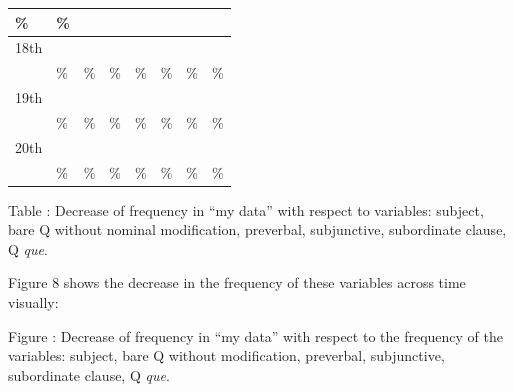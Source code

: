 \begin{center}
\begin{supertabular}{|m{0.7698598in}|m{0.6108598in}|m{0.6122598in}|m{0.6115598in}|m{0.6108598in}|m{0.6115598in}|m{0.6122598in}|m{0.6080598in}|}
\% &
\centering{}\%\\\hline
\centering 18th &
 &
 &
 &
 &
 &
 &
\centering{}\\\hline
 &
\% &
\% &
\% &
\% &
\% &
\% &
\centering{}\%\\\hline
\centering 19th &
 &
 &
 &
 &
 &
 &
\centering{}\\\hline
 &
\% &
\% &
\% &
\% &
\% &
\% &
\centering{}\%\\\hline
\centering 20th &
 &
 &
 &
 &
 &
 &
\centering{}\\\hline
 &
\% &
\% &
\% &
\% &
\% &
\% &
\centering{}\%\\\hline
\end{supertabular}
\end{center}
\begin{styleStandard}
Table : Decrease of frequency in “my data” with respect to variables: subject, bare Q without nominal modification, preverbal, subjunctive, subordinate clause, Q \textit{que}.
\end{styleStandard}

\begin{styleStandard}
Figure 8 shows the decrease in the frequency of these variables across time visually:
\end{styleStandard}

\begin{styleStandard}
Figure : Decrease of frequency in “my data” with respect to the frequency of the variables: subject, bare Q without modification, preverbal, subjunctive, subordinate clause, Q \textit{que}.
\end{styleStandard}

